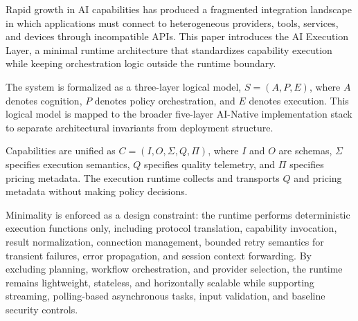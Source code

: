 Rapid growth in AI capabilities has produced a fragmented integration landscape in which applications must connect to heterogeneous providers, tools, services, and devices through incompatible APIs. This paper introduces the AI Execution Layer, a minimal runtime architecture that standardizes capability execution while keeping orchestration logic outside the runtime boundary.

The system is formalized as a three-layer logical model, $S = (A, P, E)$, where $A$ denotes cognition, $P$ denotes policy orchestration, and $E$ denotes execution. This logical model is mapped to the broader five-layer AI-Native implementation stack to separate architectural invariants from deployment structure.

Capabilities are unified as $C = (I, O, \Sigma, Q, \Pi)$, where $I$ and $O$ are schemas, $\Sigma$ specifies execution semantics, $Q$ specifies quality telemetry, and $\Pi$ specifies pricing metadata. The execution runtime collects and transports $Q$ and pricing metadata without making policy decisions.

Minimality is enforced as a design constraint: the runtime performs deterministic execution functions only, including protocol translation, capability invocation, result normalization, connection management, bounded retry semantics for transient failures, error propagation, and session context forwarding. By excluding planning, workflow orchestration, and provider selection, the runtime remains lightweight, stateless, and horizontally scalable while supporting streaming, polling-based asynchronous tasks, input validation, and baseline security controls.
